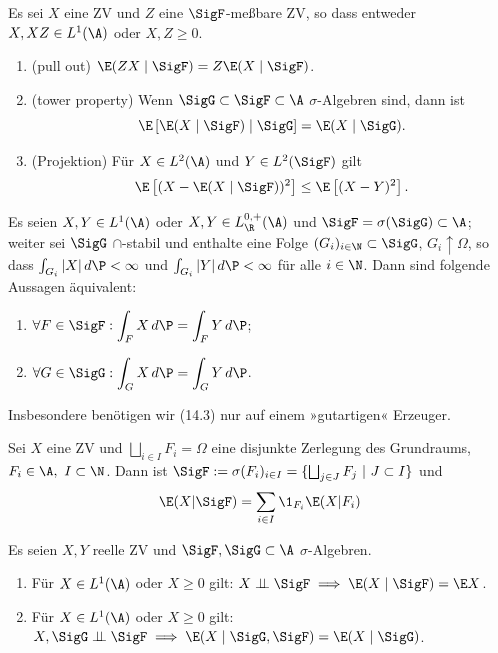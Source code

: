 \documentclass[11pt, a4paper]{article}
\begin{document}
\begin{theorem} \Theorem
    Es sei $X$ eine ZV und $Z$ eine $\SigF$-meßbare ZV, so dass entweder $X, XZ \in L^1(\A)$ oder $X, Z \ge 0$.
    \begin{enumerate}[label=\alph*)]
        \item (pull out) $\E(ZX \mid \SigF) = Z \E(X \mid \SigF)$.
        \item (tower property) Wenn $\SigG \subset \SigF \subset \A$ $\sigma$-Algebren sind, dann ist
        $$\E\left[\E(X \mid \SigF) \mid \SigG\right] = \E(X \mid \SigG).$$
        \item (Projektion) Für $X \in L^2(\A)$ und $Y \in L^2(\SigF)$ gilt
        $$\E\left[(X - \E(X \mid \SigF))^2\right] \le \E\left[(X - Y)^2\right].$$
    \end{enumerate}
\end{theorem}

\begin{lemma}
    Es seien $X, Y \in L^1(\A)$ oder $X, Y \in L^{0,+}_{\R}(\A)$ und $\SigF = \sigma(\SigG) \subset \A$; weiter sei $\SigG$ $\cap$-stabil und enthalte eine Folge $(G_i)_{i \in \N} \subset \SigG$, $G_i \uparrow \Omega$, so dass $\int_{G_i} |X| \, d\P < \infty$ und $\int_{G_i} |Y| \, d\P < \infty$ für alle $i \in \N$. Dann sind folgende Aussagen äquivalent:
    \begin{enumerate}[label=\alph*)]
        \item $\forall F \in \SigF: \displaystyle\int_F X \, d\P = \int_F Y \, d\P$;
        \item $\forall G \in \SigG: \displaystyle\int_G X \, d\P = \int_G Y \, d\P$.
    \end{enumerate}
    Insbesondere benötigen wir (14.3) nur auf einem »gutartigen« Erzeuger.
\end{lemma}

\begin{example}\label{Bsp.1}
    Sei $X$ eine ZV und $\bigsqcup _{i\in I}F_i = \Omega $ eine disjunkte Zerlegung des Grundraums, $F_i \in \A, \ I\subset \N$. Dann ist $\SigF := \sigma(F_i)_{i\in I} = \{ \bigsqcup_{j\in J} F_j\ | \ J\subset I\}$ und 
    $$\E(X| \SigF) = \sum_{i\in I} \1_{F_i} \E(X|F_i)$$
\end{example}

\begin{theorem}
    Es seien $X, Y$ reelle ZV und $\SigF, \SigG \subset \A$ $\sigma$-Algebren.
    \begin{enumerate}[label=\alph*)]
        \item Für $X \in L^1(\A)$ oder $X \ge 0$ gilt: $X \perp\!\!\!\perp \SigF \implies \E(X \mid \SigF) = \E X$.
        \item Für $X \in L^1(\A)$ oder $X \ge 0$ gilt: $X, \SigG \perp\!\!\!\perp \SigF \implies \E(X \mid \SigG, \SigF) = \E(X \mid \SigG)$.
    \end{enumerate}
\end{theorem}
\end{document}
